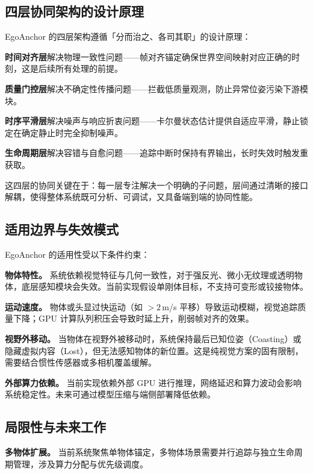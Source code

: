 \documentclass[review]{vgtc}
\begin{document}
\subsection{四层协同架构的设计原理}

EgoAnchor 的四层架构遵循「分而治之、各司其职」的设计原理：

\noindent\textbf{时间对齐层}解决物理一致性问题——帧对齐锚定确保世界空间映射对应正确的时刻，这是后续所有处理的前提。

\noindent\textbf{质量门控层}解决不确定性传播问题——拦截低质量观测，防止异常位姿污染下游模块。

\noindent\textbf{时序平滑层}解决噪声与响应折衷问题——卡尔曼状态估计提供自适应平滑，静止锁定在确定静止时完全抑制噪声。

\noindent\textbf{生命周期层}解决容错与自愈问题——追踪中断时保持有界输出，长时失效时触发重获取。

这四层的协同关键在于：每一层专注解决一个明确的子问题，层间通过清晰的接口解耦，使得整体系统既可分析、可调试，又具备端到端的协同性能。

\subsection{适用边界与失效模式}

EgoAnchor 的适用性受以下条件约束：

\noindent\textbf{物体特性。} 系统依赖视觉特征与几何一致性，对于强反光、微小无纹理或透明物体，底层感知模块会失效。当前实现假设单刚体目标，不支持可变形或铰接物体。

\noindent\textbf{运动速度。} 物体或头显过快运动（如 $>2$\,m/s 平移）导致运动模糊，视觉追踪质量下降；GPU 计算队列积压会导致时延上升，削弱帧对齐的效果。

\noindent\textbf{视野外移动。} 当物体在视野外被移动时，系统保持最后已知位姿（Coasting）或隐藏虚拟内容（Lost），但无法感知物体的新位置。这是纯视觉方案的固有限制，需要结合惯性传感器或多相机覆盖缓解。

\noindent\textbf{外部算力依赖。} 当前实现依赖外部 GPU 进行推理，网络延迟和算力波动会影响系统稳定性。未来可通过模型压缩与端侧部署降低依赖。

\subsection{局限性与未来工作}

\noindent\textbf{多物体扩展。} 当前系统聚焦单物体锚定，多物体场景需要并行追踪与独立生命周期管理，涉及算力分配与优先级调度。
\end{document}
